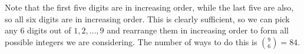 Note that the first five digits are in increasing order, while the last five are also, so all six digits are in increasing order. This is clearly sufficient, so we can pick any $6$ digits out of $1,2,\ldots,9$ and rearrange them in increasing order to form all possible integers we are considering. The number of ways to do this is $\binom{9}{6}=\boxed{84}$.